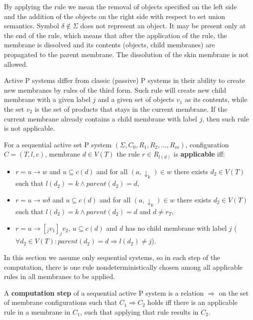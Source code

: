   By applying the rule we mean the removal of objects specified on the left side and the addition of the objects on the right side with respect to set union semantics.
  Symbol $\delta\notin\Sigma$ does not represent an object. It may be present only at the end of the rule, which means that after the application of the rule, the membrane is dissolved and its contents (objects, child membranes) are propagated to the parent membrane. The dissolution of the skin membrane is not allowed. 

  Active P systems differ from classic (passive) P systems in their ability to create new membranes by rules of the third form. Such rule will create new child membrane with a given label $j$ and a given set of objects $v_1$ as its contents, while the set $v_2$ is the set of products that stays in the current membrane. If the current membrane already contains a child membrane with label $j$, then such rule is not applicable.


  For a sequential active set P system $(\Sigma, C_0, R_1, R_2, \dots , R_m)$, configuration $C = (T, l, c)$, membrane $d\in V(T)$ the rule $r\in R_{l(d)}$ is {\bf applicable} iff:
  \begin{itemize}
    \item $r = u\rightarrow w$ and $u\subseteq c(d)$ and for all $(a,\downarrow_k)\in w$ there exists $d_2\in V(T)$ such that $l(d_2)=k \wedge parent(d_2) = d$,
    \item $r = u\rightarrow w\delta$ and $u\subseteq c(d)$ and for all $(a,\downarrow_k)\in w$ there exists $d_2\in V(T)$ such that $l(d_2)=k \wedge parent(d_2) = d$ and $d\neq r_T$,
    \item $r = u\rightarrow [_j v_1]_j v_2$, $u\subseteq c(d)$ and $d$ has no child membrane with label $j$ ($\forall d_2\in V(T):  parent(d_2)=d \Rightarrow l(d_2)\neq j$).
  \end{itemize}

  In this section we assume only sequential systems, so in each step of the computation, there is one rule nondeterministically chosen among all applicable rules in all membranes to be applied.


  A {\bf computation step} of a sequential active P system is a relation $\Rightarrow$ on the set of membrane configurations such that $C_1 \Rightarrow C_2$ holds iff there is an applicable rule in a membrane in $C_1$, such that applying that rule results in $C_2$.

